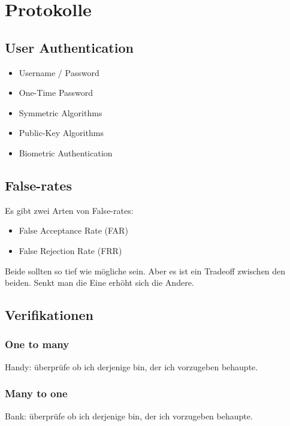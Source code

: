 \documentclass[12pt]{scrartcl}
\begin{document}
\newpage
\section{Protokolle}


\subsection{User Authentication}

\begin{itemize}
    \item Username / Password
    \item One-Time Password
    \item Symmetric Algorithms
    \item Public-Key Algorithms
    \item Biometric Authentication
\end{itemize}

\vspace{0.5cm}
\subsection{False-rates}
Es gibt zwei Arten von False-rates:
\begin{itemize}
    \item False Acceptance Rate (FAR)
    \item False Rejection Rate (FRR)
\end{itemize}

Beide sollten so tief wie mögliche sein. Aber es ist ein Tradeoff zwischen den beiden.
Senkt man die Eine erhöht sich die Andere.


\subsection{Verifikationen}
\subsubsection{One to many}
Handy: überprüfe ob ich derjenige bin, der ich vorzugeben behaupte.


\subsubsection{Many to one}
Bank: überprüfe ob ich derjenige bin, der ich vorzugeben behaupte.



\end{document}
